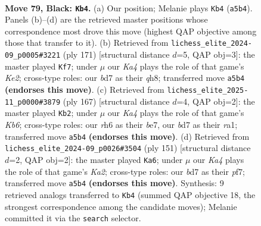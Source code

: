 \documentclass[11pt]{article}
\begin{document}
\clearpage

\begin{figure}[p]\centering
\begin{subfigure}{0.46\textwidth}\centering
\resizebox{\linewidth}{!}{%
\newchessgame
\chessboard[
  setfen={8/3B1P2/7R/k7/7P/8/5K2/8 b - - 2 79},
  showmover=false,
  pgfstyle=straightmove, color=movearrow, markmove={a5-b4}
]}
\caption{}
\end{subfigure}\hfill
\begin{subfigure}{0.46\textwidth}\centering
\resizebox{\linewidth}{!}{%
\newchessgame
\chessboard[
  setfen={7Q/4k3/6R1/2K5/6P1/8/8/8 b - - 0 86},
  showmover=false,
  pgfstyle=straightmove, color=movearrow, markmove={e7-f7}
]}
\caption{}
\end{subfigure}
\\[4pt]
\begin{subfigure}{0.46\textwidth}\centering
\resizebox{\linewidth}{!}{%
\newchessgame
\chessboard[
  setfen={8/4B2P/8/8/7P/1k6/5K2/R7 b - - 0 84},
  showmover=false,
  pgfstyle=straightmove, color=movearrow, markmove={b3-b2}
]}
\caption{}
\end{subfigure}\hfill
\begin{subfigure}{0.46\textwidth}\centering
\resizebox{\linewidth}{!}{%
\newchessgame
\chessboard[
  setfen={7R/k4P2/2K5/8/7P/8/8/8 b - - 0 76},
  showmover=false,
  pgfstyle=straightmove, color=movearrow, markmove={a7-a6}
]}
\caption{}
\end{subfigure}
\caption{\textbf{Move 79, Black: \texttt{Kb4}.} (a) Our position; Melanie plays \texttt{Kb4} (\texttt{a5b4}). Panels (b)--(d) are the retrieved master positions whose correspondence most drove this move (highest QAP objective among those that transfer to it). (b) Retrieved from \texttt{lichess\_elite\_2024-09\_p0005\#3221} (ply 171) [structural distance $d$=5, QAP obj=3]: the master played \texttt{Kf7}; under $\mu$ our \emph{Ka4} plays the role of that game's \emph{Ke2}; cross-type roles: our \emph{b}d7 as their \emph{q}h8; transferred move \texttt{a5b4} \textbf{(endorses this move)}. (c) Retrieved from \texttt{lichess\_elite\_2025-11\_p0000\#3879} (ply 167) [structural distance $d$=4, QAP obj=2]: the master played \texttt{Kb2}; under $\mu$ our \emph{Ka4} plays the role of that game's \emph{Kb6}; cross-type roles: our \emph{r}h6 as their \emph{b}e7, our \emph{b}d7 as their \emph{r}a1; transferred move \texttt{a5b4} \textbf{(endorses this move)}. (d) Retrieved from \texttt{lichess\_elite\_2024-09\_p0026\#3504} (ply 151) [structural distance $d$=2, QAP obj=2]: the master played \texttt{Ka6}; under $\mu$ our \emph{Ka4} plays the role of that game's \emph{Ka2}; cross-type roles: our \emph{b}d7 as their \emph{p}f7; transferred move \texttt{a5b4} \textbf{(endorses this move)}. Synthesis: 9 retrieved analogs transferred to \texttt{Kb4} (summed QAP objective 18, the strongest correspondence among the candidate moves); Melanie committed it via the \texttt{search} selector.}
\label{fig:thought-m157}
\end{figure}
\end{document}
